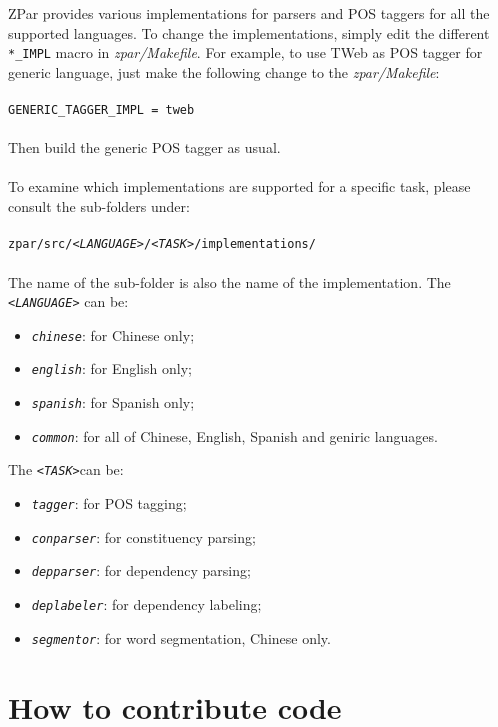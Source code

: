 \documentclass[12pt]{article}
\begin{document}
\begin{CJK}{GBK}{song}
ZPar provides various implementations for parsers and POS taggers for all the supported languages.
To change the implementations, simply edit the different \texttt{*\_IMPL} macro in \textit{zpar/Makefile}.
For example, to use TWeb as POS tagger for generic language, just make the following change to the \textit{zpar/Makefile}:
\\
\\
\hspace{3cm}\texttt{GENERIC\_TAGGER\_IMPL = tweb}
\\
\\
Then build the generic POS tagger as usual.
\\
\\
To examine which implementations are supported for a specific task,
please consult the sub-folders under:
\\
\\
\texttt{zpar/src/\textit{<LANGUAGE>}/\textit{<TASK>}/implementations/}
\\
\\
The name of the sub-folder is also the name of the implementation.
The \texttt{\textit{<LANGUAGE>}} can be:
\begin{itemize}
\item \texttt{\textit{chinese}}: for Chinese only;
\item \texttt{\textit{english}}: for English only;
\item \texttt{\textit{spanish}}: for Spanish only;
\item \texttt{\textit{common}}: for all of Chinese, English, Spanish and geniric languages.
\end{itemize}
The \texttt{\textit{<TASK>}}can be:
\begin{itemize}
\item \texttt{\textit{tagger}}: for POS tagging;
\item \texttt{\textit{conparser}}: for constituency parsing;
\item \texttt{\textit{depparser}}: for dependency parsing;
\item \texttt{\textit{deplabeler}}: for dependency labeling;
\item \texttt{\textit{segmentor}}: for word segmentation, Chinese only.
\end{itemize}

\section{How to contribute code}
\label{sec:customizing-zpar}


\end{CJK}
\end{document}
